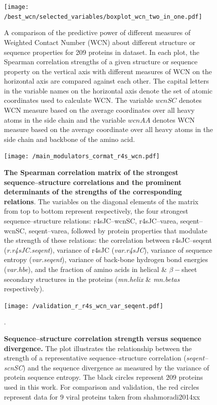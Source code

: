 \documentclass[11pt]{article}
\begin{document}
    \begin{figure}[tbh]
        \begin{center}
        \texttt{[image: /best\_wcn/selected\_variables/boxplot\_wcn\_two\_in\_one.pdf]}
        \end{center}
        \caption{A comparison of the predictive power of different measures of Weighted Contact Number (WCN) about different structure or sequence properties for 209 proteins in dataset. In each plot, the Spearman correlation strengths of a given structure or sequence property on the vertical axis with different measures of WCN on the horizontal axis are compared against each other. The capital letters in the variable names on the horizontal axis denote the set of atomic coordinates used to calculate WCN. The variable $wcnSC$ denotes WCN measure based on the average coordinates over all heavy atoms in the side chain and the variable $wcnAA$ denotes WCN measure based on the average coordinate over all heavy atoms in the side chain and backbone of the amino acid.}
        \label{fig:best_wcn}
    \end{figure}

    \begin{figure}[tbh]
        \centering
        \texttt{[image: /main\_modulators\_cormat\_r4s\_wcn.pdf]} \\
        \caption{{\bf The Spearman correlation matrix of the strongest sequence--structure correlations and the prominent determinants of the strengths of the corresponding relations}. The variables on the diagonal elements of the matrix from top to bottom represent respectively, the four strongest sequence--structure relations: r4sJC--wcnSC, r4sJC--varea, seqent--wcnSC, seqent--varea, followed by protein properties that modulate the strength of these relations: the correlation between r4sJC--seqent ({\it r.r4sJC.seqent}), variance of r4sJC ({\it var.r4sJC}), variance of sequence entropy ({\it var.seqent}), variance of back-bone hydrogen bond energies ({\it var.hbe}), and the fraction of amino acids in helical \& $\beta-$sheet secondary structures in the proteins ({\it mn.helix} \& {\it mn.betas} respectively).}
        \label{fig:mainmods}
    \end{figure}

    \begin{figure}[tbh]
        \centering
        \texttt{[image: /validation\_r\_r4s\_wcn\_var\_seqent.pdf]}
        \caption{{\bf Sequence--structure correlation strength versus sequence divergence.} The plot illustrates the relationship between the strength of a representative sequence--structure correlation ({\it seqent--scnSC}) and the sequence divergence as measured by the variance of protein sequence entropy. The black circles represent $209$ proteins used in this work. For comparison and validation, the red circles represent data for $9$ viral proteins taken from {shahmoradi2014xx}}.
        \label{fig:validation}
    \end{figure}
\end{document}
